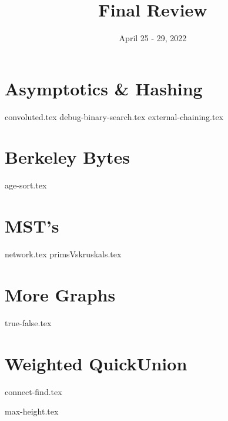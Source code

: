 \documentclass[11pt]{exam}
\title{Final Review}
\date{April 25 - 29, 2022}
\begin{document}
\maketitle

\section{Asymptotics \& Hashing}
\begin{questions}
{convoluted.tex}
{debug-binary-search.tex}
{external-chaining.tex}
\end{questions}

\newpage
\section{Berkeley Bytes}
\begin{questions}
{age-sort.tex}
\end{questions}

\newpage
\section{MST's}
\begin{questions}
{network.tex}
{primsVskruskals.tex}
\end{questions}

\newpage
\section{More Graphs}
\begin{questions}
{true-false.tex}
\end{questions}

\newpage
\section{Weighted QuickUnion}
\begin{questions}
{connect-find.tex}

{max-height.tex}
\end{questions}
\end{document}
